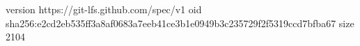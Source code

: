 version https://git-lfs.github.com/spec/v1
oid sha256:e2cd2eb535ff3a8af0683a7eeb41ce3b1e0949b3c235729f2f5319ccd7bfba67
size 2104
